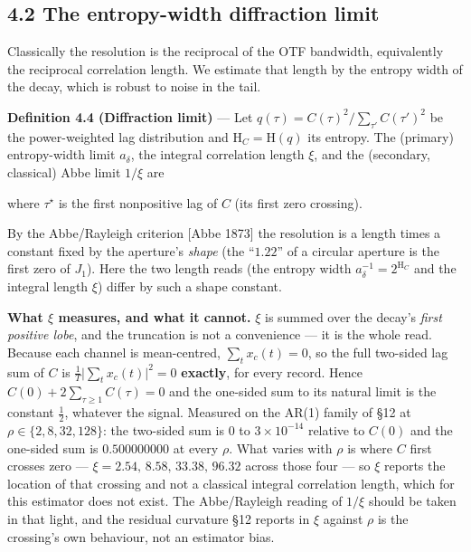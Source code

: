 \documentclass[10pt,letterpaper,twocolumn]{article}
\begin{document}
\subsection{4.2 The entropy-width diffraction limit}\label{42-the-entropy-width-diffraction-limit}

Classically the resolution is the reciprocal of the OTF bandwidth, equivalently the reciprocal correlation length. We estimate that length by the entropy width of the decay, which is robust to noise in the tail.

\textbf{Definition 4.4 (Diffraction limit)} --- Let \(q(\tau)=C(\tau)^2/\sum_{\tau'}C(\tau')^2\) be the power-weighted lag distribution and \(\mathrm{H}_C=\mathrm{H}(q)\) its entropy. The (primary) entropy-width limit \(a_\delta\), the integral correlation length \(\xi\), and the (secondary, classical) Abbe limit \(1/\xi\) are


where \(\tau^\star\) is the first nonpositive lag of \(C\) (its first zero crossing).

By the Abbe/Rayleigh criterion {[}Abbe 1873{]} the resolution is a length times a constant fixed by the aperture's \emph{shape} (the ``\(1.22\)'' of a circular aperture is the first zero of \(J_1\)). Here the two length reads (the entropy width \(a_\delta^{-1}=2^{\mathrm{H}_C}\) and the integral length \(\xi\)) differ by such a shape constant.

\textbf{What \(\xi\) measures, and what it cannot.} \(\xi\) is summed over the decay's \emph{first positive lobe}, and the truncation is not a convenience --- it is the whole read. Because each channel is mean-centred, \(\sum_t x_c(t)=0\), so the full two-sided lag sum of \(C\) is \(\tfrac1T\big|\sum_t x_c(t)\big|^2=0\) \textbf{exactly}, for every record. Hence \(C(0)+2\sum_{\tau\ge1}C(\tau)=0\) and the one-sided sum to its natural limit is the constant \(\tfrac12\), whatever the signal. Measured on the AR(1) family of §12 at \(\rho\in\{2,8,32,128\}\): the two-sided sum is \(0\) to \(3\times10^{-14}\) relative to \(C(0)\) and the one-sided sum is \(0.500000000\) at every \(\rho\). What varies with \(\rho\) is where \(C\) first crosses zero --- \(\xi=2.54,\,8.58,\,33.38,\,96.32\) across those four --- so \(\xi\) reports the location of that crossing and not a classical integral correlation length, which for this estimator does not exist. The Abbe/Rayleigh reading of \(1/\xi\) should be taken in that light, and the residual curvature §12 reports in \(\xi\) against \(\rho\) is the crossing's own behaviour, not an estimator bias.
\end{document}
